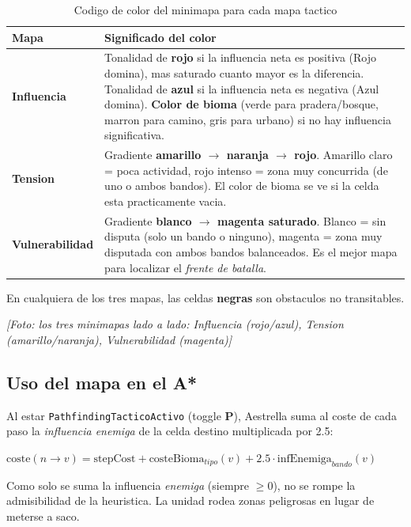 \documentclass[12pt,a4paper]{article}
\newcommand{\fotoplaceholder}[1]{%
    \par\medskip\noindent%
    \begin{center}%
    \begin{tcolorbox}[
        colback=fotobg,
        colframe=fotoborder,
        boxrule=0.8pt,
        arc=2pt,
        width=0.85\textwidth,
        halign=center,
        valign=center,
        height=2.4cm
    ]
    \itshape\color{gray} [Foto: #1]
    \end{tcolorbox}%
    \end{center}\medskip%
}
\begin{document}
\begin{table}[H]
\centering
\caption{Codigo de color del minimapa para cada mapa tactico}
\label{tab:colores}
\renewcommand{\arraystretch}{1.2}
\begin{tabularx}{\textwidth}{l X}
\toprule
\textbf{Mapa} & \textbf{Significado del color} \\
\midrule
\textbf{Influencia} &
Tonalidad de \textbf{rojo} si la influencia neta es positiva (Rojo domina),
mas saturado cuanto mayor es la diferencia.
Tonalidad de \textbf{azul} si la influencia neta es negativa (Azul domina).
\textbf{Color de bioma} (verde para pradera/bosque, marron para camino,
gris para urbano) si no hay influencia significativa. \\

\textbf{Tension} &
Gradiente \textbf{amarillo $\to$ naranja $\to$ rojo}.
Amarillo claro = poca actividad, rojo intenso = zona muy concurrida
(de uno o ambos bandos). El color de bioma se ve si la celda esta
practicamente vacia. \\

\textbf{Vulnerabilidad} &
Gradiente \textbf{blanco $\to$ magenta saturado}.
Blanco = sin disputa (solo un bando o ninguno), magenta = zona muy
disputada con ambos bandos balanceados. Es el mejor mapa para localizar
el \emph{frente de batalla}. \\
\bottomrule
\end{tabularx}
\end{table}

En cualquiera de los tres mapas, las celdas \textbf{negras} son
obstaculos no transitables.

\fotoplaceholder{los tres minimapas lado a lado: Influencia (rojo/azul), Tension (amarillo/naranja), Vulnerabilidad (magenta)}

\subsection{Uso del mapa en el A*}

Al estar \texttt{PathfindingTacticoActivo} (toggle \textbf{P}), Aestrella
suma al coste de cada paso la \emph{influencia enemiga} de la celda
destino multiplicada por 2.5:

\begin{formulabox}
\centering
$\text{coste}(n \to v) = \text{stepCost} + \text{costeBioma}_{tipo}(v) + 2.5 \cdot \text{infEnemiga}_{bando}(v)$
\end{formulabox}

Como solo se suma la influencia \emph{enemiga} (siempre $\geq 0$), no
se rompe la admisibilidad de la heuristica. La unidad rodea zonas
peligrosas en lugar de meterse a saco.
\end{document}
